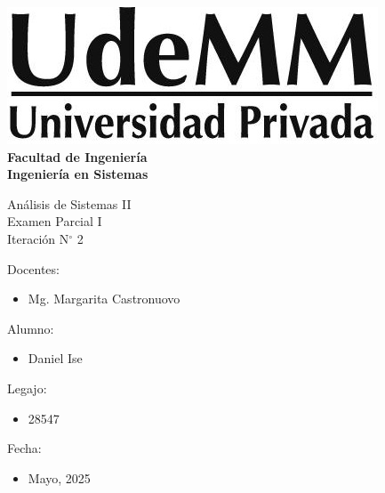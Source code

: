 \begin{titlepage}
    \begin{center}
        \vspace*{.5cm}
        \includegraphics[scale=.5]{img/udemm-logo.png}\\
        \vspace{.2cm}
        \Large
        \textbf{Facultad de Ingeniería}\\
        \textbf{Ingeniería en Sistemas}\\
        \vspace{2cm}

        \Huge
        Análisis de Sistemas II \\
        Examen Parcial I \\
        Iteración N\(^\circ\) 2 \\
        \vfill

        \raggedright
        \Large
        Docentes:
        \begin{itemize}
            \item[] Mg. Margarita Castronuovo \\
        \end{itemize}
        Alumno:
        \begin{itemize}
            \item[] Daniel Ise
        \end{itemize}
        Legajo:
        \begin{itemize}
            \item[] 28547
        \end{itemize}
        Fecha:
        \begin{itemize}
            \item[] Mayo, 2025
        \end{itemize}
    \end{center}
\end{titlepage}
